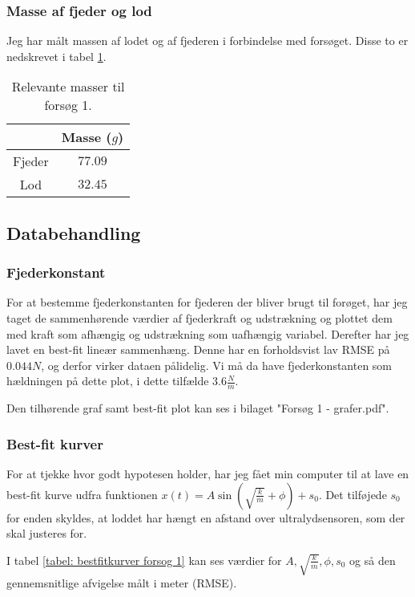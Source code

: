 \subsubsection{Masse af fjeder og lod}\label{exp1: Masse af fjeder og lod}
Jeg har målt massen af lodet og af fjederen i forbindelse med forsøget. 
Disse to er nedskrevet i tabel \ref{tabel: Masser forsog 1}.
\begin{table}[h]
\centering
\begin{tabular}{|c|c|}
\hline 
 & Masse ($g$) \\ 
\hline 
Fjeder & $77.09$ \\ 
\hline 
Lod & $32.45$ \\ 
\hline 
\end{tabular} 
\caption{Relevante masser til forsøg 1.}
\label{tabel: Masser forsog 1}
\end{table}

\subsection{Databehandling}\label{exp1: databehandling afsnit}
\subsubsection{Fjederkonstant}\label{databehandling: tyk fjeder fjederkonstant}
For at bestemme fjederkonstanten for fjederen der bliver brugt til forøget, har jeg taget de sammenhørende værdier af fjederkraft og udstrækning og plottet dem med kraft som afhængig og udstrækning som uafhængig variabel. 
Derefter har jeg lavet en best-fit lineær sammenhæng. 
Denne har en forholdsvist lav RMSE på $0.044N$, og derfor virker dataen pålidelig. 
Vi må da have fjederkonstanten som hældningen på dette plot, i dette tilfælde $3.6\frac{N}{m}$.

Den tilhørende graf samt best-fit plot kan ses i bilaget "Forsøg 1 - grafer.pdf". 
 

\subsubsection{Best-fit kurver}\label{exp1: Best-fit kurver}
For at tjekke hvor godt hypotesen holder, har jeg fået min computer til at lave en best-fit kurve udfra funktionen $x(t)=A\sin (\sqrt{\frac{k}{m}}+\phi) + s_0$.
Det tilføjede $s_0$ for enden skyldes, at loddet har hængt en afstand over ultralydsensoren, som der skal justeres for. 

I tabel \ref{tabel: bestfitkurver forsog 1} kan ses værdier for $A, \sqrt{\frac{k}{m}}, \phi ,s_0$ og så den gennemsnitlige afvigelse målt i meter (RMSE).


